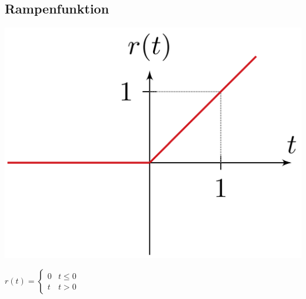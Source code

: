 	\subsection{Rampenfunktion}
		\begin{minipage}{0.2\textwidth}
			\includegraphics[width=\textwidth]{./bilder/funktionen/rampenF.png}
		\end{minipage}
		\qquad
		\begin{minipage}{0.45\textwidth}
			$r(t)=\begin{cases}
						{0} & {t \leq 0} \\ 
						{t} & {t>0}
					\end{cases}$
		\end{minipage}
		\qquad
		\begin{minipage}{0.25\textwidth}						
		\end{minipage}		
		
